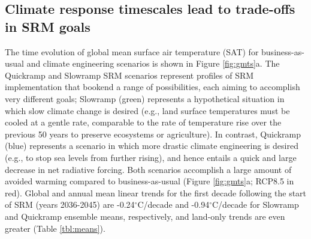 \documentclass[grl]{AGUTeX}  %
\begin{document}
\begin{article}

\section{Climate response timescales lead to trade-offs in SRM goals}

The time evolution of global mean surface air temperature (SAT) for business-as-usual and climate engineering scenarios is shown in Figure \ref{fig:gmts}a. The Quickramp and Slowramp SRM scenarios represent profiles of SRM implementation that bookend a range of possibilities, each aiming to accomplish very different goals; Slowramp (green) represents a hypothetical situation in which slow climate change is desired (e.g., land surface temperatures must be cooled at a gentle rate, comparable to the rate of temperature rise over the previous 50 years to preserve ecosystems or agriculture). In contrast, Quickramp (blue) represents a scenario in which more drastic climate engineering is desired (e.g., to stop sea levels from further rising), and hence entails a quick and large decrease in net radiative forcing. Both scenarios accomplish a large amount of avoided warming compared to business-as-usual (Figure \ref{fig:gmts}a; RCP8.5 in red). Global and annual mean linear trends for the first decade following the start of SRM (years 2036-2045) are -0.24$^\circ$C/decade and -0.94$^\circ$C/decade for Slowramp and Quickramp ensemble means, respectively, and land-only trends are even greater (Table \ref{tbl:means}). 


\end{article}
\end{document}
